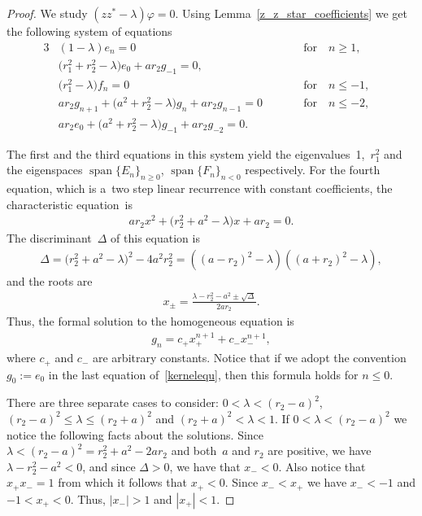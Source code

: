 \documentclass[11pt]{article}
\numberwithin{equation}{section}
\begin{document}
\begin{proof}
We study $(zz^*-\lambda)\varphi=0$.
Using Lemma~\ref{z_z_star_coefficients} we get the following system of equations
\begin{alignat}{3}
& (1-\lambda)e_n=0 && \text{for}\quad n\ge1,&\nonumber
\\
 & \big(r_1^2+ r_2^2-\lambda\big)e_0+ar_2g_{-1}=0,&&&\nonumber
\\
&\big(r_1^2-\lambda\big)f_n=0 &&\text{for}\quad n\le-1,& \label{kernelequ}
\\
& ar_2g_{n+1}+\big(a^2+r_2^2-\lambda\big)g_n+ar_2g_{n-1}=0 \qquad && \text{for}\quad n\le-2,&\nonumber
\\
 & ar_2e_0+\big(a^2+r_2^2-\lambda\big)g_{-1}+ar_2g_{-2}=0.&&&\nonumber
\end{alignat}

The f\/irst and the third equations in this system yield the eigenvalues~1,~$r_1^2$ and the eigenspaces
$\operatorname{span} \{E_n\}_{n\geq 0}$, $\operatorname{span}\{F_n\}_{n< 0}$ respectively.
For the fourth equation, which is a~two step linear recurrence with constant coef\/f\/icients, the characteristic equation~is
\begin{gather*}
ar_2x^2+\big(r_2^2+a^2-\lambda\big)x+ar_2= 0.
\end{gather*}
The discriminant~$\Delta$ of this equation is
\begin{gather*}
\Delta=\big(r_2^2+a^2-\lambda\big)^2-4a^2r_2^2=\left((a-r_2)^2-\lambda\right)\left((a+r_2)^2-\lambda\right),
\end{gather*}
and the roots are
\begin{gather*}
x_{\pm}=\frac{\lambda-r_2^2-a^2 \pm \sqrt{\Delta}}{2ar_2}.
\end{gather*}
Thus, the formal solution to the homogeneous equation is
\begin{gather}
\label{ghomsol}
g_n=c_+x_+^{n+1}+c_-x_-^{n+1},
\end{gather}
where $c_+$ and $c_-$ are arbitrary constants.
Notice that if we adopt the convention $g_0:=e_0$ in the last equation of~\eqref{kernelequ}, then this formula holds for
$n\le 0$.

There are three separate cases to consider: $0<\lambda<(r_2-a)^2$, $(r_2-a)^2\leq \lambda\leq (r_2+a)^2$ and
$(r_2+a)^2<\lambda<1$.
If $0<\lambda<(r_2-a)^2$ we notice the following facts about the solutions.
Since $\lambda<(r_2-a)^2=r_2^2+a^2-2ar_2$ and both~$a$ and $r_2$ are positive, we have $\lambda-r_2^2-a^2<0$, and
since $\Delta>0$, we have that $x_-<0$.
Also notice that $x_+x_-=1$ from which it follows that $x_+<0$.
Since $x_-<x_+$ we have $x_-<-1$ and $-1<x_+<0$.
Thus, $|x_-|>1$ and $|x_+|<1$.


\end{proof}
\end{document}
